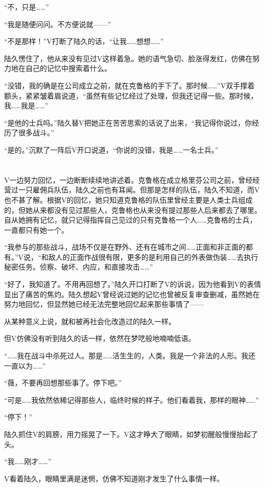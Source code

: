 “不，只是……”

“我是随便问问。不方便说就——”

“不是那样！”V打断了陆久的话，“让我……想想……”

陆久愣住了，他从来没有见过V这样着急。她的语气急切、脸涨得发红，仿佛在努力地在自己的记忆中搜索着什么。

“没错，我的确是在公司成立之前，就在克鲁格的手下了。那时候……”V双手撑着额头，紧紧皱着眉说道，“虽然有些记忆经过了处理，但我还记得一些。那时候，我……我是……”

“是他的士兵吗。”陆久替V把她正在苦苦思索的话说了出来，“我记得你说过，你经历了很多战斗。”

“是的。”沉默了一阵后V开口说道，“你说的没错，我是……一名士兵。”

\section*{}

V一边努力回忆，一边断断续续地讲述着。克鲁格在成立格里芬公司之前，曾经经营过一只雇佣兵队伍，陆久之前也有耳闻。但那是怎样的队伍，陆久不知道，而V也不甚了解。根据V的回忆，她只知道克鲁格的队伍里曾经主要是人类士兵组成的，但她从来都没有见过那些人，克鲁格也从来没有提过那些人后来都去了哪里。自从她拥有记忆，就只记得指挥自己见过的只有克鲁格一个人……克鲁格的士兵，一直都只有她一个。

“我参与的那些战斗，战场不仅是在野外、还有在城市之间……正面和非正面的都有。”V说，“和敌人的正面作战很有限，更多的是利用自己的外表做伪装……去执行秘密任务。侦察、破坏、内应，和直接攻击……”

“好了，我知道了。不用再回想了。”陆久开口打断了V的诉说，因为他看到V的表情显出了痛苦的焦灼。陆久想起V曾经说过她的记忆也曾被反复审查删减，虽然她在努力地回忆，但显然她已经无法完整地回忆起来那些事情了——

从某种意义上说，就和被再社会化改造过的陆久一样。

但V仿佛没有听到陆久的话一样，依然在梦呓般地喃喃低语。

 “……我在战斗中杀死过人。那是……活生生的，人类。我是一个非法的人形。我还一直以为……”

“薇，不要再回想那些事了。停下吧。”

“可是……我依然依稀记得那些人，临终时候的样子。他们看着我，那样的眼神……”

“停下！”

陆久抓住V的肩膀，用力摇晃了一下。V这才睁大了眼睛，如梦初醒般慢慢抬起了头。

“我……刚才……”

V看着陆久，眼睛里满是迷惘，仿佛不知道刚才发生了什么事情一样。

